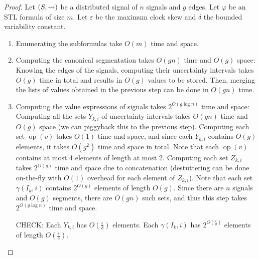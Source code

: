 \begin{proof}
	Let $(S, {\rightsquigarrow})$ be a distributed signal of $n$ signals and $g$ edges.
	Let $\varphi$ be an STL formula of size $m$.
	Let $\varepsilon$ be the maximum clock skew and $\delta$ the bounded variability constant.
		
	\begin{enumerate}
		\item 
		Enumerating the subformulas take $O(m)$ time and space.
		
		\item 
		Computing the canonical segmentation takes $O(gn)$ time and $O(g)$ space: %
		Knowing the edges of the signals, computing their uncertainty intervals takes $O(g)$ time in total and results in $O(g)$ values to be stored.
		Then, merging the lists of values obtained in the previous step can be done in $O(gn)$ time.
		
		\item
		Computing the value expressions of signals takes $2^{O(g \log n)}$ time and space:
		Computing all the sets $Y_{k,i}$ of uncertainty intervals takes $O(gn)$ time and $O(g)$ space (we can piggyback this to the previous step).
		Computing each set $\operatorname{op}(v)$ takes $O(1)$ time and space, and since each $Y_{k,i}$ contains $O(g)$ elements, %
		it takes $O(g^2)$ time and space in total.
		Note that each $\operatorname{op}(v)$ contains at most 4 elements of length at most 2.
		Computing each set $Z_{k,i}$ takes $2^{O(g)}$ time and space due to concatenation (destuttering can be done on-the-fly with $O(1)$ overhead for each element of $Z_{k,i}$).
		Note that each set $\gamma(I_k, i)$ contains $2^{O(g)}$ elements of length $O(g)$.
		Since there are $n$ signals and $O(g)$ segments, there are $O(gn)$ such sets, and thus this step takes $2^{O(g \log n)}$ time and space. 
		
		\alert{
		CHECK:
		Each $Y_{k,i}$ has $O(\frac{\varepsilon}{\delta})$ elements.
		Each $\gamma(I_k, i)$ has $2^{O(\frac{\varepsilon}{\delta})}$ elements of length $O(\frac{\varepsilon}{\delta})$.
		}
		
		

\end{enumerate}
\end{proof}
